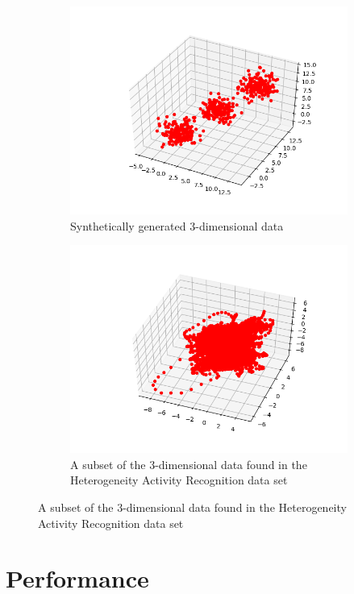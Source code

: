 \documentclass{l4proj}
\begin{document}
\begin{figure}[H]
\begin{subfigure}{.5\textwidth}
  \includegraphics[width=1\linewidth]{images/figure_3}
  \caption{Synthetically generated 3-dimensional data}
  \label{fig:sub1}
\end{subfigure}%
\begin{subfigure}{.5\textwidth}
  \includegraphics[width=1\linewidth]{images/figure_4}
  \caption{A subset of the 3-dimensional data found in the Heterogeneity Activity Recognition data set}
  \label{fig:sub2}
\end{subfigure}
\label{used data}
\end{figure}

\section{Performance}
\end{document}
